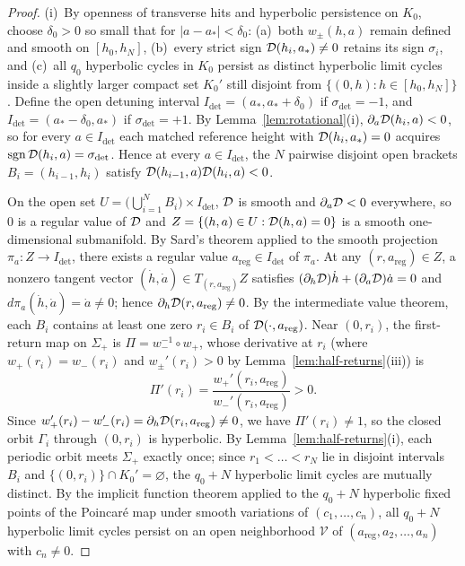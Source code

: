 \begin{proof}
(i)~By openness of transverse hits and hyperbolic persistence on $K_0$, choose $\delta_0>0$ so small that for $|a-a_*|<\delta_0$: (a)~both $w_\pm(h,a)$ remain defined and smooth on $[h_0,h_N]$, (b)~every strict sign $\mathcal{D}(h_i,a_*)\neq 0$ retains its sign $\sigma_i$, and (c)~all $q_0$ hyperbolic cycles in $K_0$ persist as distinct hyperbolic limit cycles inside a slightly larger compact set $K_0'$ still disjoint from $\{(0,h):h\in[h_0,h_N]\}$. Define the open detuning interval $I_{\mathrm{det}}=(a_*,a_*+\delta_0)$ if $\sigma_{\mathrm{det}}=-1$, and $I_{\mathrm{det}}=(a_*-\delta_0,a_*)$ if $\sigma_{\mathrm{det}}=+1$. By Lemma~\ref{lem:rotational}(i), $\partial_a\mathcal{D}(h_i,a)<0$, so for every $a\in I_{\mathrm{det}}$ each matched reference height with $\mathcal{D}(h_i,a_*)=0$ acquires $\operatorname{sgn}\mathcal{D}(h_i,a)=\sigma_{\mathrm{det}}$. Hence at every $a\in I_{\mathrm{det}}$, the $N$ pairwise disjoint open brackets $B_i=(h_{i-1},h_i)$ satisfy $\mathcal{D}(h_{i-1},a)\mathcal{D}(h_i,a)<0$.

On the open set $U=\big(\bigcup_{i=1}^N B_i\big)\times I_{\mathrm{det}}$, $\mathcal{D}$ is smooth and $\partial_a\mathcal{D}<0$ everywhere, so $0$ is a regular value of $\mathcal{D}$ and $Z=\{(h,a)\in U:\mathcal{D}(h,a)=0\}$ is a smooth one-dimensional submanifold. By Sard's theorem applied to the smooth projection $\pi_a:Z\to I_{\mathrm{det}}$, there exists a regular value $a_{\mathrm{reg}}\in I_{\mathrm{det}}$ of $\pi_a$. At any $(r,a_{\mathrm{reg}})\in Z$, a nonzero tangent vector $(\dot h,\dot a)\in T_{(r,a_{\mathrm{reg}})}Z$ satisfies $(\partial_h\mathcal{D})\dot h+(\partial_a\mathcal{D})\dot a=0$ and $d\pi_a(\dot h,\dot a)=\dot a\neq 0$; hence $\partial_h\mathcal{D}(r,a_{\mathrm{reg}})\neq 0$. By the intermediate value theorem, each $B_i$ contains at least one zero $r_i\in B_i$ of $\mathcal{D}(\cdot,a_{\mathrm{reg}})$. Near $(0,r_i)$, the first-return map on $\Sigma_+$ is $\Pi=w_-^{-1}\circ w_+$, whose derivative at $r_i$ (where $w_+(r_i)=w_-(r_i)$ and $w_\pm'(r_i)>0$ by Lemma~\ref{lem:half-returns}(iii)) is
\[
  \Pi'(r_i) = \frac{w_+'(r_i,a_{\mathrm{reg}})}{w_-'(r_i,a_{\mathrm{reg}})} > 0.
\]
Since $w_+'(r_i)-w_-'(r_i)=\partial_h\mathcal{D}(r_i,a_{\mathrm{reg}})\neq 0$, we have $\Pi'(r_i)\neq 1$, so the closed orbit $\Gamma_i$ through $(0,r_i)$ is hyperbolic. By Lemma~\ref{lem:half-returns}(i), each periodic orbit meets $\Sigma_+$ exactly once; since $r_1<\dots<r_N$ lie in disjoint intervals $B_i$ and $\{(0,r_i)\}\cap K_0'=\varnothing$, the $q_0+N$ hyperbolic limit cycles are mutually distinct. By the implicit function theorem applied to the $q_0+N$ hyperbolic fixed points of the Poincaré map under smooth variations of $(c_1,\dots,c_n)$, all $q_0+N$ hyperbolic limit cycles persist on an open neighborhood $\mathcal{V}$ of $(a_{\mathrm{reg}},a_2,\dots,a_n)$ with $c_n\neq 0$.


\end{proof}
